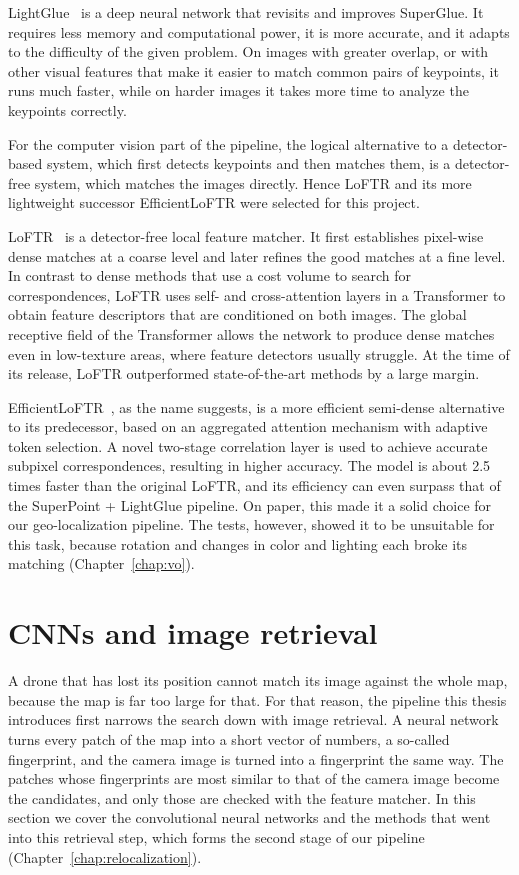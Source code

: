 \documentclass[english, Lau, oneside]{sapthesis}%
\begin{document}
LightGlue~\citep{lindenberger2023lightglue} is a deep neural network that revisits and improves SuperGlue. It requires less memory and computational power, it is more accurate, and it adapts to the difficulty of the given problem. On images with greater overlap, or with other visual features that make it easier to match common pairs of keypoints, it runs much faster, while on harder images it takes more time to analyze the keypoints correctly.

For the computer vision part of the pipeline, the logical alternative to a detector-based system, which first detects keypoints and then matches them, is a detector-free system, which matches the images directly. Hence LoFTR and its more lightweight successor EfficientLoFTR were selected for this project.

LoFTR~\citep{sun2021loftr} is a detector-free local feature matcher. It first establishes pixel-wise dense matches at a coarse level and later refines the good matches at a fine level. In contrast to dense methods that use a cost volume to search for correspondences, LoFTR uses self- and cross-attention layers in a Transformer to obtain feature descriptors that are conditioned on both images. The global receptive field of the Transformer allows the network to produce dense matches even in low-texture areas, where feature detectors usually struggle. At the time of its release, LoFTR outperformed state-of-the-art methods by a large margin.

EfficientLoFTR~\citep{wang2024efficientloftr}, as the name suggests, is a more efficient semi-dense alternative to its predecessor, based on an aggregated attention mechanism with adaptive token selection. A novel two-stage correlation layer is used to achieve accurate subpixel correspondences, resulting in higher accuracy. The model is about 2.5 times faster than the original LoFTR, and its efficiency can even surpass that of the SuperPoint + LightGlue pipeline. On paper, this made it a solid choice for our geo-localization pipeline. The tests, however, showed it to be unsuitable for this task, because rotation and changes in color and lighting each broke its matching (Chapter~\ref{chap:vo}).

\section{CNNs and image retrieval}
\label{sec:bg-retrieval}
A drone that has lost its position cannot match its image against the whole map, because the map is far too large for that. For that reason, the pipeline this thesis introduces first narrows the search down with image retrieval. A neural network turns every patch of the map into a short vector of numbers, a so-called fingerprint, and the camera image is turned into a fingerprint the same way. The patches whose fingerprints are most similar to that of the camera image become the candidates, and only those are checked with the feature matcher. In this section we cover the convolutional neural networks and the methods that went into this retrieval step, which forms the second stage of our pipeline (Chapter~\ref{chap:relocalization}).
\end{document}
